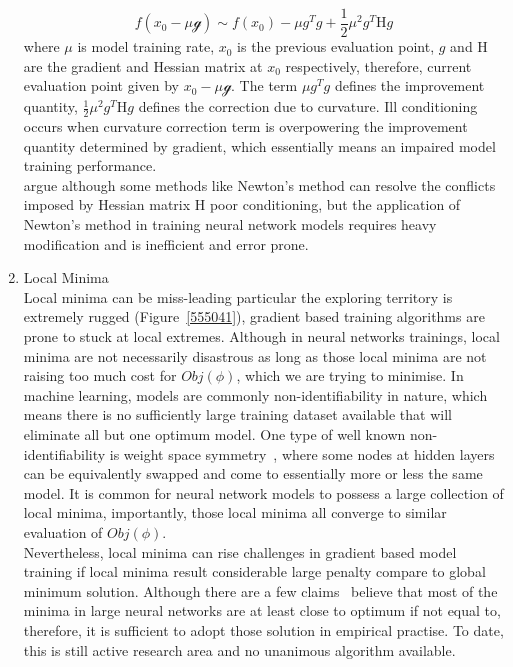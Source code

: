 \begin{enumerate}
\begin{equation}
    f(x_0-\mu\mathcal{g}) \sim f(x_0) - \mu g^Tg + \frac{1}{2}\mu^2g^T\mathrm{H}g
\end{equation}
where $\mu$ is model training rate, $x_0$ is the previous evaluation point, $g$ and $\mathrm{H}$ are the gradient and Hessian matrix at $x_0$ respectively, therefore, current evaluation point given by $x_0-\mu\mathcal{g}$. The term $\mu g^Tg$ defines the improvement quantity, $\frac{1}{2}\mu^2g^T\mathrm{H}g$ defines the correction due to curvature. Ill conditioning occurs when curvature correction term is overpowering the improvement quantity determined by gradient, which essentially means an impaired model training performance. \\
\citet{Goodfellow-et-al-2016} argue although some methods like Newton's method can resolve the conflicts imposed by Hessian matrix $\mathrm{H}$ poor conditioning, but the application of Newton's method in training neural network models requires heavy modification and is inefficient and error prone. 
    \item Local Minima \\
Local minima can be miss-leading particular the exploring territory is extremely rugged (Figure~\ref{555041}), gradient based training algorithms are prone to stuck at local extremes. Although in neural networks trainings, local minima are not necessarily disastrous as long as those local minima are not raising too much cost for $Obj(\phi)$, which we are trying to minimise. In machine learning, models are commonly non-identifiability in nature, which means there is no sufficiently large training dataset available that will eliminate all but one optimum model. One type of well known non-identifiability is weight space symmetry~\cite{BadrinarayananM15}, where some nodes at hidden layers can be equivalently swapped and come to essentially more or less the same model. It is common for neural network models to possess a large collection of local minima, importantly, those local minima all converge to similar evaluation of $Obj(\phi)$. \\
Nevertheless, local minima can rise challenges in gradient based model training if local minima result considerable large penalty compare to global minimum solution. Although there are a few claims~\cite{DauphinPGCGB14,goodfellow_2015,ChoromanskaHMAL14,SaxeMG13} believe that most of the minima in large neural networks are at least close to optimum if not equal to, therefore, it is sufficient to adopt those solution in empirical practise. To date, this is still active research area and no unanimous algorithm available. 

\end{enumerate}
